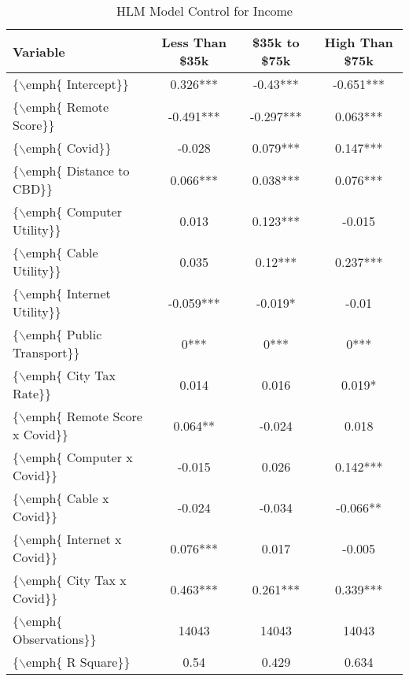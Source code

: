 \begin{table}[ht]
\centering
\begin{tabular}{|l|c|c|c|}
  \hline
Variable & Less Than \$35k & \$35k to \$75k & High Than \$75k \\ 
  \hline
\{$\backslash$emph\{ Intercept\}\} & 0.326*** & -0.43*** & -0.651*** \\ 
  \{$\backslash$emph\{ Remote Score\}\} & -0.491*** & -0.297*** & 0.063*** \\ 
  \{$\backslash$emph\{ Covid\}\} & -0.028 & 0.079*** & 0.147*** \\ 
  \{$\backslash$emph\{ Distance to CBD\}\} & 0.066*** & 0.038*** & 0.076*** \\ 
  \{$\backslash$emph\{ Computer Utility\}\} & 0.013 & 0.123*** & -0.015 \\ 
  \{$\backslash$emph\{ Cable Utility\}\} & 0.035 & 0.12*** & 0.237*** \\ 
  \{$\backslash$emph\{ Internet Utility\}\} & -0.059*** & -0.019* & -0.01 \\ 
  \{$\backslash$emph\{ Public Transport\}\} & 0*** & 0*** & 0*** \\ 
  \{$\backslash$emph\{ City Tax Rate\}\} & 0.014 & 0.016 & 0.019* \\ 
  \{$\backslash$emph\{ Remote Score x Covid\}\} & 0.064** & -0.024 & 0.018 \\ 
  \{$\backslash$emph\{ Computer x Covid\}\} & -0.015 & 0.026 & 0.142*** \\ 
  \{$\backslash$emph\{ Cable x Covid\}\} & -0.024 & -0.034 & -0.066** \\ 
   \hline\hline
\{$\backslash$emph\{ Internet x Covid\}\} & 0.076*** & 0.017 & -0.005 \\ 
  \{$\backslash$emph\{ City Tax x Covid\}\} & 0.463*** & 0.261*** & 0.339*** \\ 
  \{$\backslash$emph\{ Observations\}\} & 14043 & 14043 & 14043 \\ 
  \{$\backslash$emph\{ R Square\}\} & 0.54 & 0.429 & 0.634 \\ 
   \hline
\end{tabular}
\caption{HLM Model Control for Income} 
\end{table}
